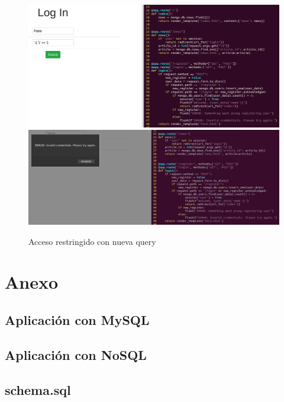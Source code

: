 \documentclass[a4paper,oneside]{article}
\begin{document}
\begin{enumerate}[label=\textbf{\alph*)}]
\begin{figure}[h!]
  \centering
  \includegraphics[scale=0.3]{images/securenosql3.png}\\
  \vspace{1cm}
  \includegraphics[scale=0.3]{images/securenosql4.png}
  \caption{Acceso restringido con nueva query}
  \label{fig:secure_nosql2}
\end{figure}
\end{enumerate}

\newpage
\appendix
\section{Anexo}
\subsection{Aplicación con MySQL}
\label{ann:app_mysql.py}


\subsection{Aplicación con NoSQL}
\label{ann:app_nosql.py}


\UseRawInputEncoding
\subsection{schema.sql}
\label{ann:schema.sql}

\end{document}

